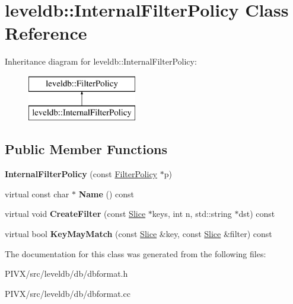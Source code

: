 \hypertarget{classleveldb_1_1_internal_filter_policy}{}\section{leveldb\+:\+:Internal\+Filter\+Policy Class Reference}
\label{classleveldb_1_1_internal_filter_policy}
Inheritance diagram for leveldb\+:\+:Internal\+Filter\+Policy\+:\begin{figure}[H]
\begin{center}
\leavevmode
\includegraphics[height=2.000000cm]{classleveldb_1_1_internal_filter_policy}
\end{center}
\end{figure}
\subsection*{Public Member Functions}
\begin{DoxyCompactItemize}
\item 
\mbox{\label{classleveldb_1_1_internal_filter_policy_a55469eb6ea941243cd1c65eb14bd8978}} 
{\bfseries Internal\+Filter\+Policy} (const \mbox{\hyperlink{classleveldb_1_1_filter_policy}{Filter\+Policy}} $\ast$p)
\item 
\mbox{\label{classleveldb_1_1_internal_filter_policy_aea56a32a2be2ad99f41c2009af823b44}} 
virtual const char $\ast$ {\bfseries Name} () const
\item 
\mbox{\label{classleveldb_1_1_internal_filter_policy_a0ed8ebb6899c13f90853f61d0e69fbaf}} 
virtual void {\bfseries Create\+Filter} (const \mbox{\hyperlink{classleveldb_1_1_slice}{Slice}} $\ast$keys, int n, std\+::string $\ast$dst) const
\item 
\mbox{\label{classleveldb_1_1_internal_filter_policy_aba61cb2c01f6c1d34128f115903ff559}} 
virtual bool {\bfseries Key\+May\+Match} (const \mbox{\hyperlink{classleveldb_1_1_slice}{Slice}} \&key, const \mbox{\hyperlink{classleveldb_1_1_slice}{Slice}} \&filter) const
\end{DoxyCompactItemize}


The documentation for this class was generated from the following files\+:\begin{DoxyCompactItemize}
\item 
P\+I\+V\+X/src/leveldb/db/dbformat.\+h\item 
P\+I\+V\+X/src/leveldb/db/dbformat.\+cc\end{DoxyCompactItemize}
